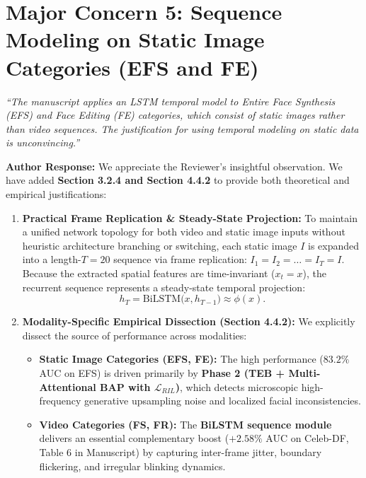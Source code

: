 \documentclass[runningheads]{llncs}
\begin{document}
\bigskip

\section*{Major Concern 5: Sequence Modeling on Static Image Categories (EFS and FE)}

\begin{tcolorbox}[colback=gray!10,colframe=gray!50,title=\textbf{Reviewer Comment 5}]
\textit{``The manuscript applies an LSTM temporal model to Entire Face Synthesis (EFS) and Face Editing (FE) categories, which consist of static images rather than video sequences. The justification for using temporal modeling on static data is unconvincing.''}
\end{tcolorbox}

\noindent\textbf{Author Response:} We appreciate the Reviewer's insightful observation. We have added \textbf{Section 3.2.4 and Section 4.4.2} to provide both theoretical and empirical justifications:

\begin{enumerate}
    \item \textbf{Practical Frame Replication \& Steady-State Projection:}  
    To maintain a unified network topology for both video and static image inputs without heuristic architecture branching or switching, each static image $I$ is expanded into a length-$T=20$ sequence via frame replication: $I_1 = I_2 = \dots = I_T = I$. Because the extracted spatial features are time-invariant ($x_t = x$), the recurrent sequence represents a steady-state temporal projection:
    \begin{equation}
        h_T = \text{BiLSTM}\big(x, h_{T-1}\big) \approx \phi(x).
    \end{equation}

    \item \textbf{Modality-Specific Empirical Dissection (Section 4.4.2):}  
    We explicitly dissect the source of performance across modalities:
    \begin{itemize}
        \item \textbf{Static Image Categories (EFS, FE):} The high performance ($83.2\%$ AUC on EFS) is driven primarily by \textbf{Phase 2 (TEB + Multi-Attentional BAP with $\mathcal{L}_{RIL}$)}, which detects microscopic high-frequency generative upsampling noise and localized facial inconsistencies.
        \item \textbf{Video Categories (FS, FR):} The \textbf{BiLSTM sequence module} delivers an essential complementary boost ($+2.58\%$ AUC on Celeb-DF, Table 6 in Manuscript) by capturing inter-frame jitter, boundary flickering, and irregular blinking dynamics.
    \end{itemize}
\end{enumerate}
\end{document}
